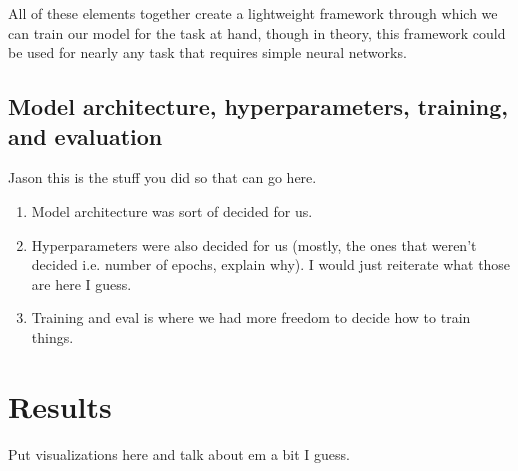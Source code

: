 \documentclass[letterpaper, 12pt]{article}
\begin{document}
All of these elements together create a lightweight framework through which we can train our model for the task at hand, though in theory, this framework could be used for nearly any task that requires simple neural networks.

\subsection{Model architecture, hyperparameters, training, and evaluation}

Jason this is the stuff you did so that can go here.
\begin{enumerate}
\item Model architecture was sort of decided for us.
\item Hyperparameters were also decided for us (mostly, the ones that weren't decided i.e. number of epochs, explain why). I would just reiterate what those are here I guess.
\item Training and eval is where we had more freedom to decide how to train things.
\end{enumerate}

\section{Results}

Put visualizations here and talk about em a bit I guess.
\end{document}
